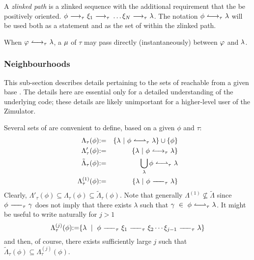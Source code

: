 A \emph{zlinked path} is a zlinked sequence with the additional requirement that the  be positively oriented.
$\phi {\ \longrightarrow_{\tau}\ } \xi_1 {\ \longrightarrow_{\tau}\ } \dots \xi_N {\ \longrightarrow_{\tau}\ } \lambda$.
The notation $\phi {\ \leftharpoonup\!\rightarrow_{\tau}\ } \lambda$ will be used both as a statement and as the set of 
within the zlinked path.

When $\varphi {\ \leftharpoonup\!\rightarrow_{\tau}\ } \lambda$, a  ${\mu}$ of
 $\tau$ may pass directly (instantaneously) between ${\varphi}$ and
${\lambda}$.

\subsubsection{Neighbourhoods}

This sub-section describes details pertaining to the sets of  reachable from a given base .
The details here are essential only for a detailed understanding of the underlying code;
these details are likely unimportant for a higher-level user of the Zimulator.

Several sets of  are convenient to define, based on a given 
$\phi$ and  $\tau$:
\begin{eqnarray}
\Lambda_\tau(\phi) &\coloneqq& \{ \lambda \ |\ \phi \zlinks{\tau} \lambda\} \cup \{\phi\} \nn\\
\Lambda'_\tau(\phi) &\coloneqq& \{ \lambda \ |\ \phi \zlinkp{\tau} \lambda\} \nn\\
\tilde{\Lambda}_\tau(\phi) &\coloneqq& \bigcup_\lambda  \phi \zlinks{\tau} \lambda \nn\\
\Lambda^{(1)}_\tau(\phi) &\coloneqq& \{ \lambda \ |\ \phi \zlink{\tau} \lambda\} \nn
\end{eqnarray}
Clearly, $\Lambda'_\tau(\phi) \subseteq \Lambda_\tau(\phi) \subseteq \tilde{\Lambda}_\tau(\phi)$.
Note that generally
$\Lambda^{(1)} \nsubseteq \tilde{\Lambda}$
since $\phi {\ -\!\!\!-\!\!\!-_{\tau}\ } \gamma$ does not imply
that there exists $\lambda$ such that $\gamma \ \in \ \phi {\ \leftharpoonup \! \rightharpoonup_{\tau}\ } \lambda$.
It might be useful to write naturally for $j>1$
\begin{equation}
\Lambda^{(j)}_\tau(\phi) \coloneqq \{ \lambda \ \mid \ \phi \zlink{\tau} \xi_1 \zlink{\tau} \xi_2 \cdots \xi_{j-1} \zlink{\tau} \lambda\} \nn
\end{equation}
and then, of course, there exists sufficiently large $j$ such that
$ \tilde{\Lambda}_\tau(\phi) \subseteq \Lambda^{(j)}_\tau(\phi) $.

